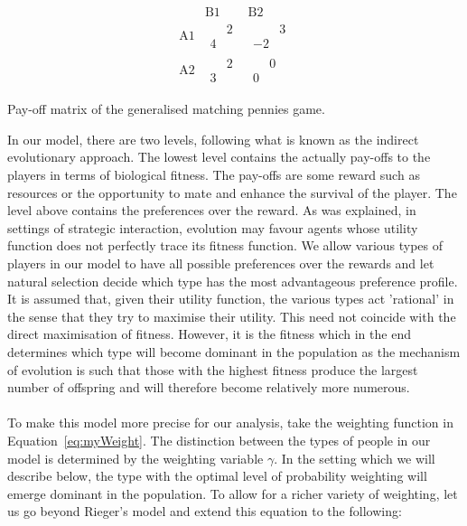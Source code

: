 \documentclass[a4paper,10pt]{article}
\numberwithin{equation}{section}
\begin{document}
\begin{table}[h]
\begin{center}
\[
\begin{array}{r|rr}
  & \text{B1} & \text{B2} \\
\hline
 \text{A1} & 
\begin{array}{ll}
   & 2 \\
 4 &  
\end{array}
 & 
\begin{array}{ll}
   & 3 \\
 -2 &  
\end{array}
 \\
 \text{A2} & 
\begin{array}{ll}
   & 2 \\
 3 &  
\end{array}
 & 
\begin{array}{ll}
   & 0 \\
 0 &  
\end{array}

\end{array}
\]
\end{center}
\caption{Pay-off matrix of the generalised matching pennies game.}
\label{tab:PayoffMatrixPWRep}
\end{table}

In our model, there are two levels, following what is known as the indirect evolutionary approach. The lowest level contains the actually pay-offs to the players in terms of biological fitness. The pay-offs are some reward such as resources or the opportunity to mate and enhance the survival of the player. The level above contains the preferences over the reward. As was explained, in settings of strategic interaction, evolution may favour agents whose utility function does not perfectly trace its fitness function. We allow various types of players in our model to have all possible preferences over the rewards and let natural selection decide which type has the most advantageous preference profile. It is assumed that, given their utility function, the various types act 'rational' in the sense that they try to maximise their utility. This need not coincide with the direct maximisation of fitness. However, it is the fitness which in the end determines which type will become dominant in the population as the mechanism of evolution is such that those with the highest fitness produce the largest number of offspring and will therefore become relatively more numerous.\\
\\
To make this model more precise for our analysis, take the weighting function in Equation~\ref{eq:myWeight}. The distinction between the types of people in our model is determined by the weighting variable $\gamma$. In the setting which we will describe below, the type with the optimal level of probability weighting will emerge dominant in the population. To allow for a richer variety of weighting, let us go beyond Rieger's model and extend this equation to the following:
\end{document}

